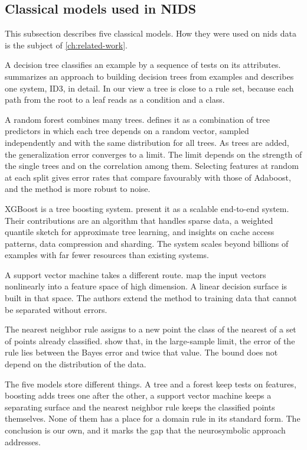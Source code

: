 \subsection{Classical models used in NIDS}
\label{sec:classical-models}

This subsection describes five classical models. How they were used on
\gls{nids} data is the subject of \cref{ch:related-work}.

A decision tree classifies an example by a sequence of tests on its
attributes. \citet{quinlan1986induction} summarizes an approach to building
decision trees from examples and describes one system, ID3, in detail. In our
view a tree is close to a rule set, because each path from the root to a leaf
reads as a condition and a class.

A random forest combines many trees. \citet{breiman2001random} defines it as
a combination of tree predictors in which each tree depends on a random
vector, sampled independently and with the same distribution for all trees.
As trees are added, the generalization error converges to a limit. The limit
depends on the strength of the single trees and on the correlation among
them. Selecting features at random at each split gives error rates that
compare favourably with those of Adaboost, and the method is more robust to
noise.

XGBoost is a tree boosting system. \citet{chen2016xgboost} present it as a
scalable end-to-end system. Their contributions are an algorithm that handles
sparse data, a weighted quantile sketch for approximate tree learning, and
insights on cache access patterns, data compression and sharding. The system
scales beyond billions of examples with far fewer resources than existing
systems.

A support vector machine takes a different route. \citet{cortes1995supportvector}
map the input vectors nonlinearly into a feature space of high dimension. A
linear decision surface is built in that space. The authors extend the method
to training data that cannot be separated without errors.

The nearest neighbor rule assigns to a new point the class of the nearest of
a set of points already classified. \citet{cover1967nearest} show that, in
the large-sample limit, the error of the rule lies between the Bayes error and
twice that value. The bound does not depend on the distribution of the data.

The five models store different things. A tree and a forest keep tests on
features, boosting adds trees one after the other, a support vector machine
keeps a separating surface and the nearest neighbor rule keeps the
classified points themselves. None of them has a place for a domain rule in
its standard form. The conclusion is our own, and it marks the gap that the
neurosymbolic approach addresses.

